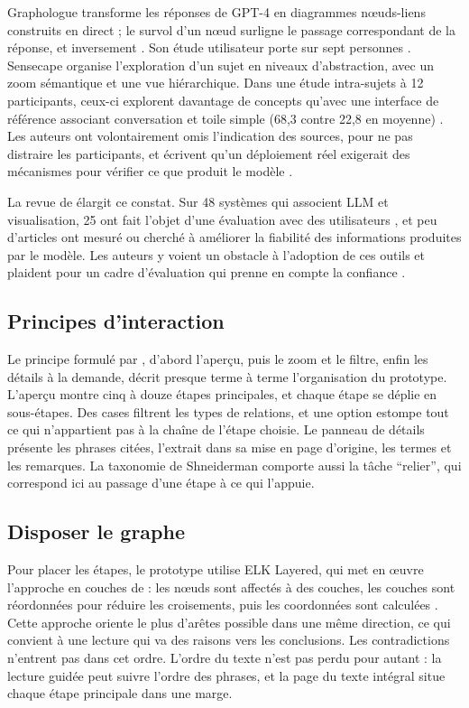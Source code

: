 Graphologue \parencite{ref02} transforme les réponses de GPT-4 en diagrammes nœuds-liens construits en direct ; le survol d’un nœud surligne le passage correspondant de la réponse, et inversement \parencite[8]{ref02}. Son étude utilisateur porte sur sept personnes \parencite[2]{ref02}. Sensecape \parencite{ref03} organise l’exploration d’un sujet en niveaux d’abstraction, avec un zoom sémantique et une vue hiérarchique. Dans une étude intra-sujets à 12 participants, ceux-ci explorent davantage de concepts qu’avec une interface de référence associant conversation et toile simple (68,3 contre 22,8 en moyenne) \parencite[9--10]{ref03}. Les auteurs ont volontairement omis l’indication des sources, pour ne pas distraire les participants, et écrivent qu’un déploiement réel exigerait des mécanismes pour vérifier ce que produit le modèle \parencite[14]{ref03}.

La revue de \textcite{ref04} élargit ce constat. Sur 48 systèmes qui associent LLM et visualisation, 25 ont fait l’objet d’une évaluation avec des utilisateurs \parencite[17]{ref04}, et peu d’articles ont mesuré ou cherché à améliorer la fiabilité des informations produites par le modèle. Les auteurs y voient un obstacle à l’adoption de ces outils et plaident pour un cadre d’évaluation qui prenne en compte la confiance \parencite[20]{ref04}.

\subsection{Principes d’interaction}

Le principe formulé par \textcite[336]{ref27}, d’abord l’aperçu, puis le zoom et le filtre, enfin les détails à la demande, décrit presque terme à terme l’organisation du prototype. L’aperçu montre cinq à douze étapes principales, et chaque étape se déplie en sous-étapes. Des cases filtrent les types de relations, et une option estompe tout ce qui n’appartient pas à la chaîne de l’étape choisie. Le panneau de détails présente les phrases citées, l’extrait dans sa mise en page d’origine, les termes et les remarques. La taxonomie de Shneiderman comporte aussi la tâche \enquote{relier}, qui correspond ici au passage d’une étape à ce qui l’appuie.

\subsection{Disposer le graphe}

Pour placer les étapes, le prototype utilise ELK Layered, qui met en œuvre l’approche en couches de \textcite{ref10} : les nœuds sont affectés à des couches, les couches sont réordonnées pour réduire les croisements, puis les coordonnées sont calculées \parencite{ref31}. Cette approche oriente le plus d’arêtes possible dans une même direction, ce qui convient à une lecture qui va des raisons vers les conclusions. Les contradictions n’entrent pas dans cet ordre. L’ordre du texte n’est pas perdu pour autant : la lecture guidée peut suivre l’ordre des phrases, et la page du texte intégral situe chaque étape principale dans une marge.

